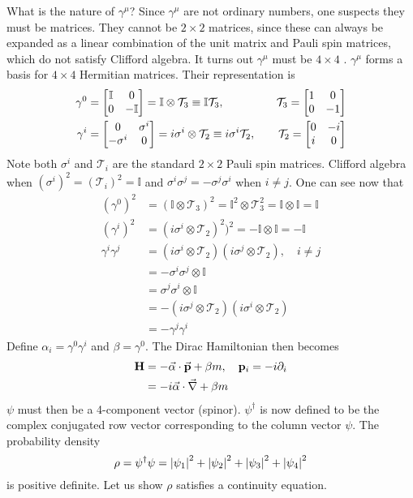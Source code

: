 \documentclass[12pt,a4paper,titlepage]{article}
\newcommand{\ul}[1]{\underline{\smash{#1}}} %
\newcommand{\Tau}{\mathcal{T}} %
\newcommand{\pd}[1]{\partial_{#1}} %
\newcommand{\id}{\mathbb{I}} %
\begin{document}
What is the nature of $\gamma^{\mu}$? Since $\gamma^{\mu}$ are not ordinary numbers, one suspects they must be matrices. They cannot be $2\times2$ matrices, since these can always be expanded as a linear combination of the unit matrix and Pauli spin matrices, which do not satisfy Clifford algebra. It turns out $\gamma^{\mu}$ must be $4\times4$ \ul{gamma matrices}. $\gamma^{\mu}$ forms a basis for $4\times4$ Hermitian matrices. Their representation is
\begin{equation}
\begin{aligned}
\gamma^{0}&=\mqty[\mathbb{I} & 0 \\ 0 & -\mathbb{I}]=\mathbb{I}\otimes\Tau_{3}\equiv\mathbb{I}\Tau_{3},\quad&\Tau_{3}=\mqty[1 & 0 \\ 0 & -1]\\
\gamma^{i}&=\mqty[0 & \sigma^{i} \\ -\sigma^{i} & 0]=i\sigma^{i}\otimes\Tau_{2}\equiv i\sigma^{i}\Tau_{2},\quad&\Tau_{2}=\mqty[0 & -i \\ i & 0]
\end{aligned}
\end{equation}
Note both $\sigma^{i}$ and $\Tau_{i}$ are the standard $2\times2$ Pauli spin matrices. Clifford algebra when $(\sigma^{i})^{2}=(\Tau_{i})^{2}=\mathbb{I}$ and $\sigma^{i}\sigma^{j}=-\sigma^{j}\sigma^{i}$ when $i\neq j$. One can see now that
\begin{equation}
\begin{aligned}
(\gamma^{0})^{2}&=(\mathbb{I}\otimes\Tau_{3})^{2}=\mathbb{I}^{2}\otimes\Tau_{3}^{2}=\mathbb{I}\otimes\mathbb{I}=\mathbb{I}\\
(\gamma^{i})^{2}&=(i\sigma^{i}\otimes\Tau_{2})^{2})^{2}=-\mathbb{I}\otimes\mathbb{I}=-\mathbb{I}\\
\gamma^{i}\gamma^{j}&=(i\sigma^{i}\otimes\Tau_{2})(i\sigma^{j}\otimes\Tau_{2}),\quad i\neq j\\
&=-\sigma^{i}\sigma^{j}\otimes\id\\
&=\sigma^{j}\sigma^{i}\otimes\id\\
&=-(i\sigma^{j}\otimes\Tau_{2})(i\sigma^{i}\otimes\Tau_{2})\\
&=-\gamma^{j}\gamma^{i}
\end{aligned}
\end{equation}
Define $\alpha_{i}=\gamma^{0}\gamma^{i}$ and $\beta=\gamma^{0}$. The Dirac Hamiltonian then becomes
\begin{equation}
\begin{aligned}
\vb{H}&=-\vec{\alpha}\cdot\vec{\vb{p}}+\beta m,\quad\vb{p}_{i}=-i\pd{i}\\
&=-i\vec{\alpha}\cdot\vec{\nabla}+\beta m
\end{aligned}
\end{equation}
$\psi$ must then be a 4-component vector (spinor). $\psi^{\dagger}$ is now defined to be the complex conjugated row vector corresponding to the column vector $\psi$. The probability density
\begin{equation}
\rho=\psi^{\dagger}\psi=\abs{\psi_{1}}^{2}+\abs{\psi_{2}}^{2}+\abs{\psi_{3}}^{2}+\abs{\psi_{4}}^{2}
\end{equation}
is positive definite. Let us show $\rho$ satisfies a continuity equation.\\
\end{document}
